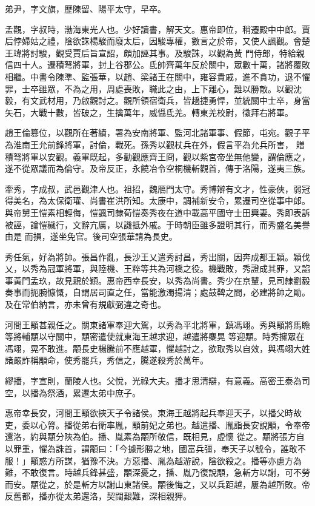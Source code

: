 \begin{pinyinscope}
 弟尹，字文旗，歷陳留、陽平太守，早卒。



 孟觀，字叔時，渤海東光人也。少好讀書，解天文。惠帝即位，稍遷殿中中郎。賈后悖婦姑之禮，陰欲誅楊駿而廢太后，因駿專權，數言之於帝，又使人諷觀。會楚王瑋將討駿，觀受賈后旨宣詔，頗加誣其事。及駿誅，以觀為黃
 門侍郎，特給親信四十人。遷積弩將軍，封上谷郡公。氐帥齊萬年反於關中，眾數十萬，諸將覆敗相繼。中書令陳準、監張華，以趙、梁諸王在關中，雍容貴戚，進不貪功，退不懼罪，士卒雖眾，不為之用，周處喪敗，職此之由，上下離心，難以勝敵。以觀沈毅，有文武材用，乃啟觀討之。觀所領宿衛兵，皆趫捷勇悍，並統關中士卒，身當矢石，大戰十數，皆破之，生擒萬年，威懾氐羌。轉東羌校尉，徵拜右將軍。



 趙王倫篡位，以觀所在著績，署為安南將軍、監河北諸軍事、假節，屯宛。觀子平為淮南王允前鋒將軍，討倫，戰死。孫秀以觀杖兵在外，假言平為允兵所害，
 贈積弩將軍以安觀。義軍既起，多勸觀應齊王冏，觀以紫宮帝坐無他變，謂倫應之，遂不從眾議而為倫守。及帝反正，永饒冶令空桐機斬觀首，傳于洛陽，遂夷三族。



 牽秀，字成叔，武邑觀津人也。祖招，魏鴈門太守。秀博辯有文才，性豪俠，弱冠得美名，為太保衛瓘、尚書崔洪所知。太康中，調補新安令，累遷司空從事中郎。與帝舅王愷素相輕侮，愷諷司隸荀愷奏秀夜在道中載高平國守士田興妻。秀即表訴被誣，論愷穢行，文辭亢厲，以譏抵外戚。于時朝臣雖多證明其行，而秀盛名美譽由是
 而損，遂坐免官。後司空張華請為長史。



 秀任氣，好為將帥。張昌作亂，長沙王乂遣秀討昌，秀出關，因奔成都王穎。穎伐乂，以秀為冠軍將軍，與陸機、王粹等共為河橋之役。機戰敗，秀證成其罪，又諂事黃門孟玖，故見親於穎。惠帝西幸長安，以秀為尚書。秀少在京輦，見司隸劉毅奏事而扼腕慷慨，自謂居司直之任，當能激濁揚清；處鼓鞞之間，必建將帥之勛。及在常伯納言，亦未曾有規獻弼違之奇也。



 河間王顒甚親任之。關東諸軍奉迎大駕，以秀為平北將軍，鎮馮翊。秀與顒將馬瞻等將輔顒以守關中，顒密遣使就東海王越求迎，越遣將麋晃
 等迎顒。時秀擁眾在馮翊，晃不敢進。顒長史楊騰前不應越軍，懼越討之，欲取秀以自效，與馮翊大姓諸嚴詐稱顒命，使秀罷兵，秀信之，騰遂殺秀於萬年。



 繆播，字宣則，蘭陵人也。父悅，光祿大夫。播才思清辯，有意義。高密王泰為司空，以播為祭酒，累遷太弟中庶子。



 惠帝幸長安，河間王顒欲挾天子令諸侯。東海王越將起兵奉迎天子，以播父時故吏，委以心膂。播從弟右衛率胤，顒前妃之弟也。越遣播、胤詣長安說顒，令奉帝還洛，約與顒分陜為伯。播、胤素為顒所敬信，既相見，虛懷
 從之。顒將張方自以罪重，懼為誅首，謂顒曰：「今據形勝之地，國富兵彊，奉天子以號令，誰敢不服！」顒惑方所謀，猶豫不決。方惡播、胤為越游說，陰欲殺之。播等亦慮方為難，不敢復言。時越兵鋒甚盛，顒深憂之，播、胤乃復說顒，急斬方以謝，可不勞而安。顒從之，於是斬方以謝山東諸侯。顒後悔之，又以兵距越，屢為越所敗。帝反舊都，播亦從太弟還洛，契闊艱難，深相親狎。




\end{pinyinscope}
